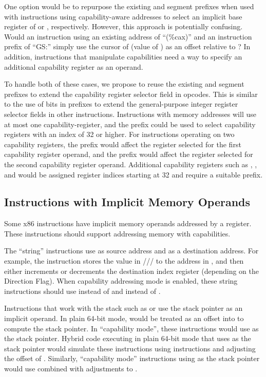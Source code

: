 One option would be to repurpose the existing \FS{} and \GS{} segment
prefixes when used with instructions using capability-aware addresses
to select an implicit base register of \CFS{} or \CGS{}, respectively.
However, this approach is potentially confusing.  Would an instruction
using an existing address of ``(\%cax)'' and an instruction prefix of
``GS:'' simply use the cursor of \CAX{} (value of \RAX{}) as an offset
relative to \CGS{}?  In addition, instructions that manipulate
capabilities need a way to specify an additional capability register
as an operand.

To handle both of these cases, we propose to reuse the existing \FS{} and
\GS{} segment prefixes to extend the capability register selector field
in opcodes.  This is similar to the use of bits in \REX{} prefixes to
extend the general-purpose integer register selector fields in other
instructions.  Instructions with memory addresses will use at most one
capability-register, and the \FS{} prefix could be used to select
capability registers with an index of 32 or higher.  For instructions
operating on two capability registers, the \FS{} prefix would affect the
register selected for the first capability register operand, and the
\GS{} prefix would affect the register selected for the second capability
register operand.  Additional capability registers such as \DDC{}, \CFS{},
and \CGS{} would be assigned register indices starting at 32 and require
a suitable prefix.

\subsection{Instructions with Implicit Memory Operands}

Some x86 instructions have implicit memory operands addressed by a
register.  These instructions should support addressing memory with
capabilities.

The ``string''
instructions use \RSI{} as source address and \RDI{} as a destination address.
For example, the
 instruction stores the value in \AL{}/\AX{}/\EAX{}/\RAX{} to the address in
\RDI{}, and then either increments or decrements the destination
index register (depending on the Direction Flag).  When capability
addressing mode is enabled,
these string instructions should use \CSI{} instead of \RSI{} and \CDI{} instead of
\RDI{}.

Instructions that work with the stack such as 
or  use the stack pointer as an implicit
operand.  In plain 64-bit mode, \RSP{} would be treated as an offset
into \DDC{} to compute the stack pointer.  In ``capability mode'',
these instructions would use \CSP{} as the stack pointer.  Hybrid code
executing in plain 64-bit mode that uses \CSP{} as the stack pointer
would simulate these instructions using 
instructions and adjusting the offset of \CSP{}.  Similarly,
``capability mode'' instructions using \RSP{} as the stack pointer
would use  combined with adjustments to \RSP{}.

